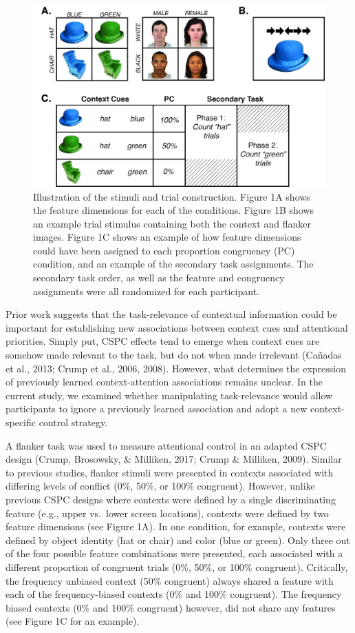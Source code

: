 \documentclass[english,,man,floatsintext]{apa6}
\begin{document}
\begin{figure}
\centering
\includegraphics{images/Task.jpg}
\caption{\label{fig:figure1}Illustration of the stimuli and trial construction. Figure 1A shows the feature dimensions for each of the conditions. Figure 1B shows an example trial stimulus containing both the context and flanker images. Figure 1C shows an example of how feature dimensions could have been assigned to each proportion congruency (PC) condition, and an example of the secondary task assignments. The secondary task order, as well as the feature and congruency assignments were all randomized for each participant.}
\end{figure}



Prior work suggests that the task-relevance of contextual information could be important for establishing new associations between context cues and attentional priorities. Simply put, CSPC effects tend to emerge when context cues are somehow made relevant to the task, but do not when made irrelevant (Cañadas et al., 2013; Crump et al., 2006, 2008). However, what determines the expression of previously learned context-attention associations remains unclear. In the current study, we examined whether manipulating task-relevance would allow participants to ignore a previously learned association and adopt a new context-specific control strategy.

A flanker task was used to measure attentional control in an adapted CSPC design (Crump, Brosowsky, \& Milliken, 2017; Crump \& Milliken, 2009). Similar to previous studies, flanker stimuli were presented in contexts associated with differing levels of conflict (0\%, 50\%, or 100\% congruent). However, unlike previous CSPC designs where contexts were defined by a single discriminating feature (e.g., upper vs.~lower screen locations), contexts were defined by two feature dimensions (see Figure 1A). In one condition, for example, contexts were defined by object identity (hat or chair) and color (blue or green). Only three out of the four possible feature combinations were presented, each associated with a different proportion of congruent trials (0\%, 50\%, or 100\% congruent). Critically, the frequency unbiased context (50\% congruent) always shared a feature with each of the frequency-biased contexts (0\% and 100\% congruent). The frequency biased contexts (0\% and 100\% congruent) however, did not share any features (see Figure 1C for an example).
\end{document}
